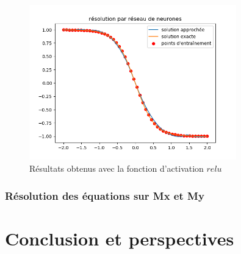 \documentclass[12pt]{report}
\begin{document}
\begin{figure}
    \centering
    \includegraphics[width=0.8\textwidth]{direct_relu_0.001_10000_32_16_v2.png}
    \caption{Résultats obtenus avec la fonction d'activation $relu$}
    \label{fig:relu apprentissage direct}
\end{figure}

\subsection{Résolution des équations sur Mx et My}


\chapter{Conclusion et perspectives}
\label{Conclusion}

\begin{thebibliography}{2}
\end{thebibliography}
\end{document}
